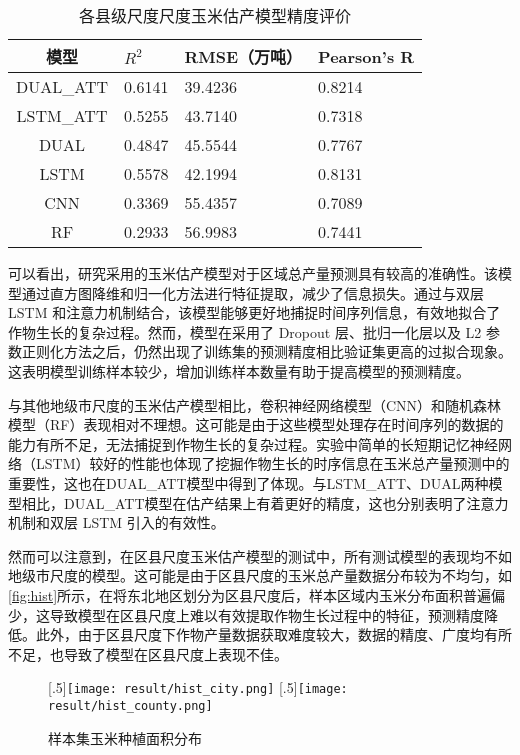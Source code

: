 \begin{table}
  \centering
  \caption{各县级尺度尺度玉米估产模型精度评价}
  \label{tab:score_county}
  \begin{tabularx}{\linewidth}{cX<{\centering}X<{\centering}X<{\centering}}
      \toprule
      模型 & $R^2$ & RMSE（万吨） & Pearson's R \\
      \midrule
      DUAL\_ATT & 0.6141 & 39.4236 & 0.8214 \\
      LSTM\_ATT & 0.5255 & 43.7140 & 0.7318 \\
      DUAL & 0.4847 & 45.5544 & 0.7767 \\
      LSTM & 0.5578 & 42.1994 & 0.8131 \\
      CNN & 0.3369 & 55.4357 & 0.7089 \\
      RF & 0.2933 & 56.9983 & 0.7441 \\ 
      \bottomrule
  \end{tabularx}
\end{table}

\par 可以看出，研究采用的玉米估产模型对于区域总产量预测具有较高的准确性。该模型通过直方图降维和归一化方法进行特征提取，减少了信息损失。通过与双层 LSTM 和注意力机制结合，该模型能够更好地捕捉时间序列信息，有效地拟合了作物生长的复杂过程。然而，模型在采用了 Dropout 层、批归一化层以及 L2 参数正则化方法之后，仍然出现了训练集的预测精度相比验证集更高的过拟合现象。这表明模型训练样本较少，增加训练样本数量有助于提高模型的预测精度。

\par 与其他地级市尺度的玉米估产模型相比，卷积神经网络模型（CNN）和随机森林模型（RF）表现相对不理想。这可能是由于这些模型处理存在时间序列的数据的能力有所不足，无法捕捉到作物生长的复杂过程。实验中简单的长短期记忆神经网络（LSTM）较好的性能也体现了挖掘作物生长的时序信息在玉米总产量预测中的重要性，这也在DUAL\_ATT模型中得到了体现。与LSTM\_ATT、DUAL两种模型相比，DUAL\_ATT模型在估产结果上有着更好的精度，这也分别表明了注意力机制和双层 LSTM 引入的有效性。

\par 然而可以注意到，在区县尺度玉米估产模型的测试中，所有测试模型的表现均不如地级市尺度的模型。这可能是由于区县尺度的玉米总产量数据分布较为不均匀，如\autoref{fig:hist}所示，在将东北地区划分为区县尺度后，样本区域内玉米分布面积普遍偏少，这导致模型在区县尺度上难以有效提取作物生长过程中的特征，预测精度降低。此外，由于区县尺度下作物产量数据获取难度较大，数据的精度、广度均有所不足，也导致了模型在区县尺度上表现不佳。

\begin{figure}
  \centering
  [.5\linewidth]{\texttt{[image: result/hist\_city.png]}}\hfill
  [.5\linewidth]{\texttt{[image: result/hist\_county.png]}}\hfill
  \caption{样本集玉米种植面积分布}
  \label{fig:hist}
\end{figure}

